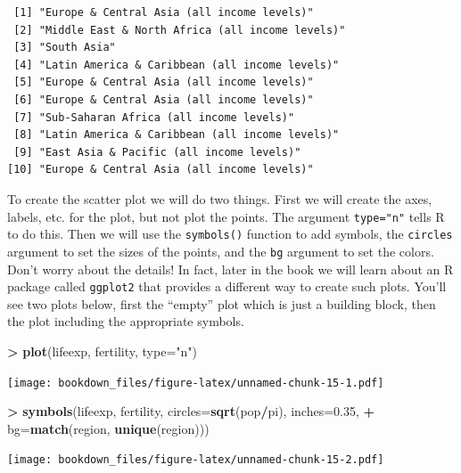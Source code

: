 \documentclass[]{krantz}
\makeatletter
\newenvironment{Shaded}{\begin{snugshade}}{\end{snugshade}}
\newcommand{\KeywordTok}[1]{\textcolor[rgb]{0.27,0.27,0.27}{\textbf{#1}}}
\newcommand{\DataTypeTok}[1]{\textcolor[rgb]{0.27,0.27,0.27}{#1}}
\newcommand{\FloatTok}[1]{\textcolor[rgb]{0.06,0.06,0.06}{#1}}
\newcommand{\StringTok}[1]{\textcolor[rgb]{0.5,0.5,0.5}{#1}}
\newcommand{\OperatorTok}[1]{\textcolor[rgb]{0.43,0.43,0.43}{\textbf{#1}}}
\newcommand{\NormalTok}[1]{#1}
\newenvironment{kframe}{%
\medskip{}
\setlength{\fboxsep}{.8em}
 \def\at@end@of@kframe{}%
 \ifinner\ifhmode%
  \def\at@end@of@kframe{\end{minipage}}%
  \begin{minipage}{\columnwidth}%
 \fi\fi%
 \def\FrameCommand##1{\hskip\@totalleftmargin \hskip-\fboxsep
 \colorbox{shadecolor}{##1}\hskip-\fboxsep
     \hskip-\linewidth \hskip-\@totalleftmargin \hskip\columnwidth}%
 \MakeFramed {\advance\hsize-\width
   \@totalleftmargin\z@ \linewidth\hsize
   \@setminipage}}%
 {\par\unskip\endMakeFramed%
 \at@end@of@kframe}
\renewenvironment{Shaded}{\begin{kframe}}{\end{kframe}}
\makeatother
\begin{document}
\begin{verbatim}
 [1] "Europe & Central Asia (all income levels)"     
 [2] "Middle East & North Africa (all income levels)"
 [3] "South Asia"                                    
 [4] "Latin America & Caribbean (all income levels)" 
 [5] "Europe & Central Asia (all income levels)"     
 [6] "Europe & Central Asia (all income levels)"     
 [7] "Sub-Saharan Africa (all income levels)"        
 [8] "Latin America & Caribbean (all income levels)" 
 [9] "East Asia & Pacific (all income levels)"       
[10] "Europe & Central Asia (all income levels)"     
\end{verbatim}

To create the scatter plot we will do two things. First we will create
the axes, labels, etc. for the plot, but not plot the points. The
argument \texttt{type="n"} tells R to do this. Then we will use the
\texttt{symbols()} function to add symbols, the \texttt{circles}
argument to set the sizes of the points, and the \texttt{bg} argument to
set the colors. Don't worry about the details! In fact, later in the
book we will learn about an R package called \texttt{ggplot2} that
provides a different way to create such plots. You'll see two plots
below, first the ``empty'' plot which is just a building block, then the
plot including the appropriate symbols.

\begin{Shaded}
\begin{Highlighting}[]
\OperatorTok{>}\StringTok{ }\KeywordTok{plot}\NormalTok{(lifeexp, fertility, }\DataTypeTok{type=}\StringTok{"n"}\NormalTok{)}
\end{Highlighting}
\end{Shaded}

\texttt{[image: bookdown\_files/figure-latex/unnamed-chunk-15-1.pdf]}

\begin{Shaded}
\begin{Highlighting}[]
\OperatorTok{>}\StringTok{ }\KeywordTok{symbols}\NormalTok{(lifeexp, fertility, }\DataTypeTok{circles=}\KeywordTok{sqrt}\NormalTok{(pop}\OperatorTok{/}\NormalTok{pi), }\DataTypeTok{inches=}\FloatTok{0.35}\NormalTok{, }
\OperatorTok{+}\StringTok{         }\DataTypeTok{bg=}\KeywordTok{match}\NormalTok{(region, }\KeywordTok{unique}\NormalTok{(region)))}
\end{Highlighting}
\end{Shaded}

\texttt{[image: bookdown\_files/figure-latex/unnamed-chunk-15-2.pdf]}
\end{document}
